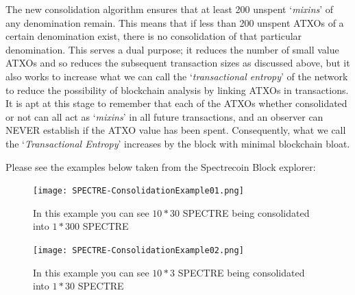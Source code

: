 \noindent
The new consolidation algorithm ensures that at least 200 unspent
‘\textit{mixins}’ of any denomination remain. This means that if less
than 200 unspent ATXOs of a certain denomination exist, there is no
consolidation of that particular denomination. This serves a dual purpose;
it reduces the number of small value ATXOs and so reduces the subsequent
transaction sizes as discussed above, but it also works to increase what
we can call the ‘\textit{transactional entropy}’ of the network to reduce
the possibility of blockchain analysis by linking ATXOs in transactions.
It is apt at this stage to remember that each of the ATXOs whether
consolidated or not can all act as ‘\textit{mixins}’ in all future
transactions, and an observer can NEVER establish if the ATXO value has
been spent. Consequently, what we call the ‘\textit{Transactional Entropy}’
increases by the block with minimal blockchain bloat.
\newpage


\noindent
Please see the examples below taken from the Spectrecoin Block explorer:



\begin{figure}[ht]
	\centering
	\texttt{[image: SPECTRE-ConsolidationExample01.png]}
	\caption{In this example you can see $10 * 30$ SPECTRE being consolidated 
	into $1 * 300$ SPECTRE}
\end{figure}
\begin{figure}[ht]
	\centering
	\texttt{[image: SPECTRE-ConsolidationExample02.png]}
	\caption{In this example you can see $10 * 3$ SPECTRE being consolidated 
	into $1 * 30$ SPECTRE}
\end{figure}



